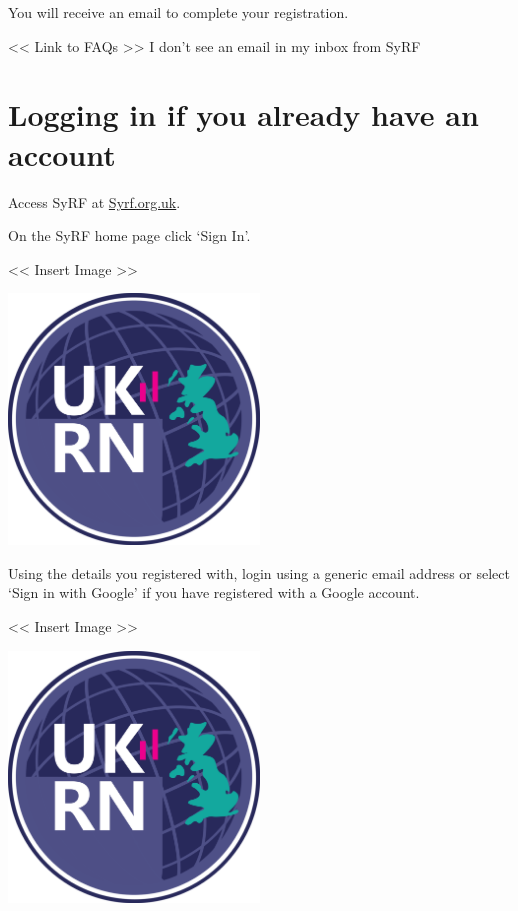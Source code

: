 \documentclass[
]{book}
\begin{document}
You will receive an email to complete your registration.

\textless{}\textless{} Link to FAQs \textgreater{}\textgreater{}
I don't see an email in my inbox from SyRF

\hypertarget{logging-in-if-you-already-have-an-account}{%
\section{Logging in if you already have an account}\label{logging-in-if-you-already-have-an-account}}

Access SyRF at \href{http://syrf.org.uk}{Syrf.org.uk}.

On the SyRF home page click `Sign In'.

\textless{}\textless{} Insert Image \textgreater{}\textgreater{}

\includegraphics[width=0.5\textwidth,height=0.5\textheight]{figs/evidence-triangle.png}

Using the details you registered with, login using a generic email address or select `Sign in with Google' if you have registered with a Google account.

\textless{}\textless{} Insert Image \textgreater{}\textgreater{}

\includegraphics[width=0.5\textwidth,height=0.5\textheight]{figs/evidence-triangle.png}
\end{document}
